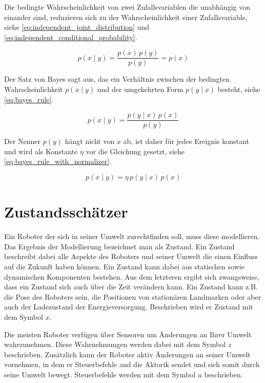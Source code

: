 Die bedingte Wahrscheinlichkeit von zwei Zufallsvariablen die unabhängig von einander sind, reduzieren sich zu der Wahrscheinlichkeit einer Zufallsvariable, siehe \autoref{eq:independent_joint_distribution} und \autoref{eq:independent_conditional_probability}.

\begin{equation}
p(x \mid y) = \frac{p(x) \, p(y)}{p(y)} = p(x) \label{eq:independent_conditional_probability}
\end{equation}

Der Satz von Bayes sagt aus, das ein Verhältnis zwischen der bedingten Wahrscheinlichkeit $p(x \mid y)$ und der umgekehrten Form $p(y \mid x)$ besteht, siehe \autoref{eq:bayes_rule}.

\begin{equation}
p(x \mid y) = \frac{p(y \mid x) \, p(x)}{p(y)} \label{eq:bayes_rule}
\end{equation}

Der Nenner $p(y)$ hängt nicht von $x$ ab, ist daher für jedes Ereignis konstant und wird als Konstante $\eta$ vor die Gleichung gesetzt, siehe \autoref{eq:bayes_rule_with_normalizer}.

\begin{equation}
p(x \mid y) = \eta \, p(y \mid x) \, p(x) \label{eq:bayes_rule_with_normalizer}
\end{equation}


%
%
%
\section{Zustandsschätzer}

Ein Roboter der sich in seiner Umwelt zurechtfinden soll, muss diese modellieren.
Das Ergebnis der Modellierung bezeichnet man als Zustand.
Ein Zustand beschreibt dabei alle Aspekte des Roboters und seiner Umwelt die einen Einfluss auf die Zukunft haben können.
Ein Zustand kann dabei aus statischen sowie dynamischen Komponenten bestehen.
Aus dem letzteren ergibt sich zwangsweise, dass ein Zustand sich auch über die Zeit verändern kann.
Ein Zustand kann z.B. die Pose des Roboters sein, die Positionen von stationären Landmarken oder aber auch der Ladezustand der Energieversorgung.
Beschrieben wird er Zustand mit dem Symbol $x$.

Die meisten Roboter verfügen über Sensoren um Änderungen an Ihrer Umwelt wahrzunehmen.
Diese Wahrnehmungen werden dabei mit dem Symbol $z$ beschrieben. Zusätzlich kann der Roboter aktiv Änderungen an seiner Umwelt vornehmen, in dem er Steuerbefehle and die Aktorik sendet und sich somit durch seine Umwelt bewegt.
Steuerbefehle werden mit dem Symbol $u$ beschrieben.

